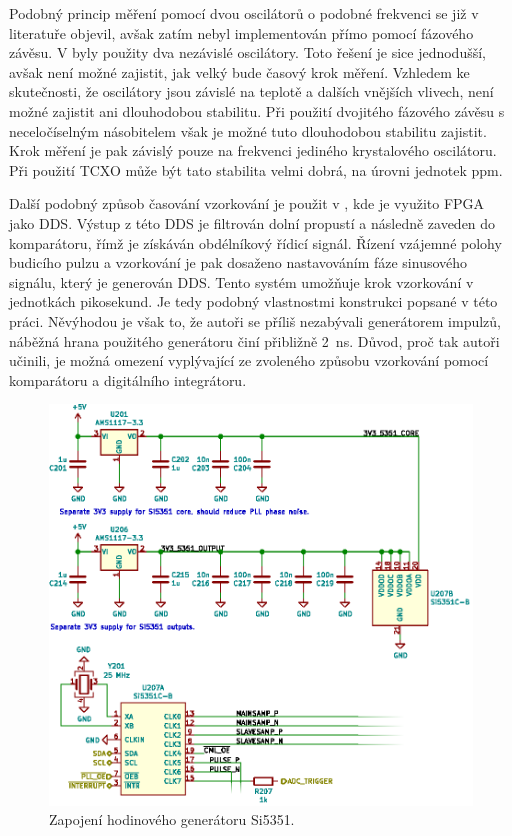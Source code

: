 Podobný princip měření pomocí dvou oscilátorů o podobné frekvenci se již v literatuře objevil, avšak zatím nebyl implementován přímo pomocí fázového závěsu. V \cite{vernierreflectometer} byly použity dva nezávislé oscilátory. Toto řešení je sice jednodušší, avšak není možné zajistit, jak velký bude časový krok měření. Vzhledem ke skutečnosti, že oscilátory jsou závislé na teplotě a dalších vnějších vlivech, není možné zajistit ani dlouhodobou stabilitu. Při použití dvojitého fázového závěsu s neceločíselným násobitelem však je možné tuto dlouhodobou stabilitu zajistit. Krok měření je pak závislý pouze na frekvenci jediného krystalového oscilátoru. Při použití \acrshort{TCXO} může být tato stabilita velmi dobrá, na úrovni jednotek \si{ppm}.

Další podobný způsob časování vzorkování je použit v \cite{ddsfpgareflectometer}, kde je využito \acrshort{FPGA} jako \acrshort{DDS}. Výstup z této \acrshort{DDS} je filtrován dolní propustí a následně zaveden do komparátoru, římž je získáván obdélníkový řídicí signál. Řízení vzájemné polohy budicího pulzu a vzorkování je pak dosaženo nastavováním fáze sinusového signálu, který je generován \acrshort{DDS}. Tento systém umožňuje krok vzorkování v jednotkách pikosekund. Je tedy podobný vlastnostmi konstrukci popsané v této práci. Něvýhodou je však to, že autoři se příliš nezabývali generátorem impulzů, náběžná hrana použitého generátoru činí přibližně \SI{2}{ns}. Důvod, proč tak autoři učinili, je možná omezení vyplývající ze zvoleného způsobu vzorkování pomocí komparátoru a digitálního integrátoru.

\begin{figure}[htbp]
\includegraphics[width=\textwidth,keepaspectratio]{images/timing_section.eps}\caption{Zapojení hodinového generátoru Si5351.}\label{timing_section_schematic}
\end{figure}	

